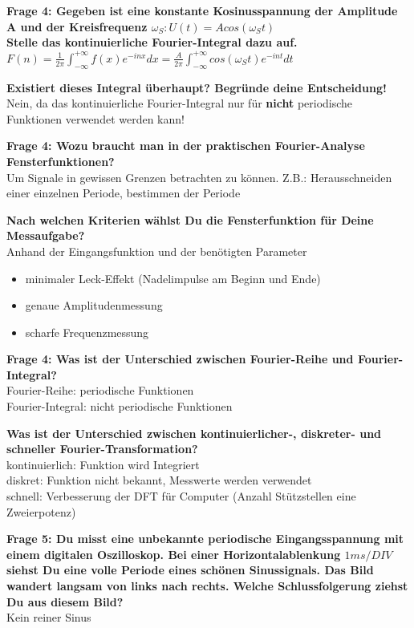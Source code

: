 \documentclass[11pt,a4paper]{scrartcl}
\begin{document}
\textbf{Frage 4: Gegeben ist eine konstante Kosinusspannung der Amplitude A und der Kreisfrequenz $\omega_S : U(t) = A cos (\omega_St)$\\Stelle das kontinuierliche Fourier-Integral dazu auf. }\\
$F(n)=\frac{1}{2\pi}\int_{-\infty}^{+\infty}f(x)e^{-inx}dx=\frac{A}{2\pi}\int_{-\infty}^{+\infty}cos(\omega_St)e^{-int}dt$

\textbf{Existiert dieses Integral überhaupt? Begründe deine Entscheidung!}\\
Nein, da das kontinuierliche Fourier-Integral nur für \textbf{nicht} periodische Funktionen verwendet werden kann!

\textbf{Frage 4: Wozu braucht man in der praktischen Fourier-Analyse Fensterfunktionen?}\\
Um Signale in gewissen Grenzen betrachten zu können. Z.B.: Herausschneiden einer einzelnen Periode, bestimmen der Periode

\textbf{Nach welchen Kriterien wählst Du die Fensterfunktion für Deine Messaufgabe?}\\
Anhand der Eingangsfunktion und der benötigten Parameter
\begin{itemize}
	\item minimaler Leck-Effekt (Nadelimpulse am Beginn und Ende)
	\item genaue Amplitudenmessung
	\item scharfe Frequenzmessung
\end{itemize}

\textbf{Frage 4: Was ist der Unterschied zwischen Fourier-Reihe und Fourier-Integral? }\\
Fourier-Reihe: periodische Funktionen\\
Fourier-Integral: nicht periodische Funktionen

\textbf{Was ist der Unterschied zwischen kontinuierlicher-, diskreter- und schneller Fourier-Transformation?}\\
kontinuierlich: Funktion wird Integriert\\
diskret: Funktion nicht bekannt, Messwerte werden verwendet\\
schnell: Verbesserung der DFT für Computer (Anzahl Stützstellen eine Zweierpotenz)

\textbf{Frage 5: Du misst eine unbekannte periodische Eingangsspannung mit einem digitalen Oszilloskop. Bei einer Horizontalablenkung $1ms/DIV$ siehst Du eine volle Periode eines schönen Sinussignals. Das Bild wandert langsam von links nach rechts. Welche Schlussfolgerung ziehst Du aus diesem Bild?}\\
Kein reiner Sinus
\end{document}
